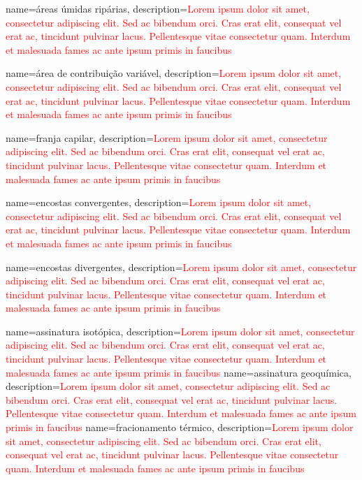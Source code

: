 {
    name=áreas úmidas ripárias,
    description={\textcolor{red}{Lorem ipsum dolor sit amet, consectetur adipiscing elit. Sed ac bibendum orci. Cras erat elit, consequat vel erat ac, tincidunt pulvinar lacus. Pellentesque vitae consectetur quam. Interdum et malesuada fames ac ante ipsum primis in faucibus}}
}

{
    name=área de contribuição variável,
    description={\textcolor{red}{Lorem ipsum dolor sit amet, consectetur adipiscing elit. Sed ac bibendum orci. Cras erat elit, consequat vel erat ac, tincidunt pulvinar lacus. Pellentesque vitae consectetur quam. Interdum et malesuada fames ac ante ipsum primis in faucibus}}
}

{
    name=franja capilar,
    description={\textcolor{red}{Lorem ipsum dolor sit amet, consectetur adipiscing elit. Sed ac bibendum orci. Cras erat elit, consequat vel erat ac, tincidunt pulvinar lacus. Pellentesque vitae consectetur quam. Interdum et malesuada fames ac ante ipsum primis in faucibus}}
}

{
    name=encostas convergentes,
    description={\textcolor{red}{Lorem ipsum dolor sit amet, consectetur adipiscing elit. Sed ac bibendum orci. Cras erat elit, consequat vel erat ac, tincidunt pulvinar lacus. Pellentesque vitae consectetur quam. Interdum et malesuada fames ac ante ipsum primis in faucibus}}
}

{
    name=encostas divergentes,
    description={\textcolor{red}{Lorem ipsum dolor sit amet, consectetur adipiscing elit. Sed ac bibendum orci. Cras erat elit, consequat vel erat ac, tincidunt pulvinar lacus. Pellentesque vitae consectetur quam. Interdum et malesuada fames ac ante ipsum primis in faucibus}}
}

{
    name=assinatura isotópica,
    description={\textcolor{red}{Lorem ipsum dolor sit amet, consectetur adipiscing elit. Sed ac bibendum orci. Cras erat elit, consequat vel erat ac, tincidunt pulvinar lacus. Pellentesque vitae consectetur quam. Interdum et malesuada fames ac ante ipsum primis in faucibus}}
}
{
    name=assinatura geoquímica,
    description={\textcolor{red}{Lorem ipsum dolor sit amet, consectetur adipiscing elit. Sed ac bibendum orci. Cras erat elit, consequat vel erat ac, tincidunt pulvinar lacus. Pellentesque vitae consectetur quam. Interdum et malesuada fames ac ante ipsum primis in faucibus}}
}
{
    name=fracionamento térmico,
    description={\textcolor{red}{Lorem ipsum dolor sit amet, consectetur adipiscing elit. Sed ac bibendum orci. Cras erat elit, consequat vel erat ac, tincidunt pulvinar lacus. Pellentesque vitae consectetur quam. Interdum et malesuada fames ac ante ipsum primis in faucibus}}
}

